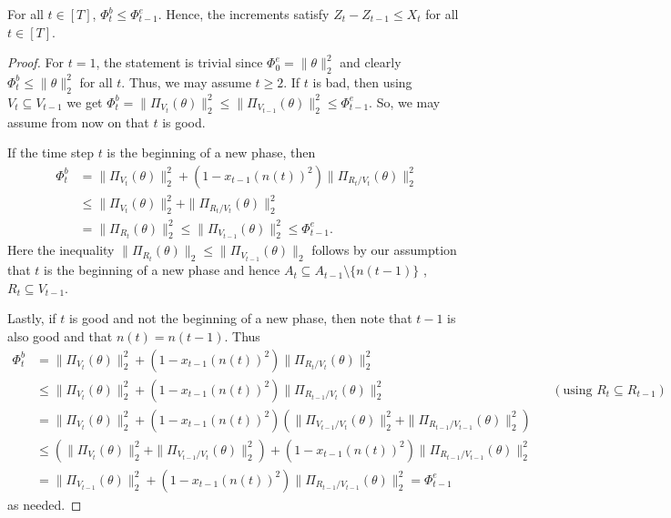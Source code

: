 \documentclass{toc}
\begin{document}
\begin{lemma}
\label{lem:freedrop}
For all $t \in [T]$, $\Phi^b_t \leq \Phi^e_{t-1}$. Hence, the increments satisfy $Z_t -Z_{t-1} \leq X_t$ for all $t \in [T]$.
\end{lemma}
\begin{proof}
For $t=1$, the statement is trivial since $\Phi^e_0 = \|\theta\|_2^2$ and
clearly $\Phi^b_t \leq \|\theta\|_2^2$ for all $t$. Thus, we may assume $t \geq 2$.
If $t$ is bad, then using $V_t \subseteq V_{t-1}$ we get $\Phi_{t}^b = \|\Pi_{V_{t}}(\theta)\|_2^2 \leq
\|\Pi_{V_{t-1}}(\theta)\|_2^2 \leq \Phi_{t-1}^e$. So, we may assume from now on that $t$ is good.

If the time step $t$ is the beginning of a new phase, then
\begin{align*}
\Phi^b_t &= \|\Pi_{V_t}(\theta)\|_2^2 + (1-x_{t-1}(n(t))^2) \|\Pi_{R_{t}/V_{t}}(\theta)\|_2^2 \\
         &\leq \|\Pi_{V_{t}}(\theta)\|_2^2 + \|\Pi_{R_{t}/V_{t}}(\theta)\|_2^2 \\
         &= \|\Pi_{R_t}(\theta)\|_2^2 \leq \|\Pi_{V_{t-1}}(\theta)\|_2^2 \leq \Phi^e_{t-1}.
\end{align*}
Here the inequality $\|\Pi_{R_{t}}(\theta)\|_2 \leq \|\Pi_{V_{t-1}}(\theta)\|_2$
follows by our assumption that $t$ is the beginning of a new phase and hence $A_t \subseteq A_{t-1} \setminus \{n(t-1)\}$ \ie, $R_{t} \subseteq V_{t-1}$.

Lastly, if $t$ is good and not the beginning of a new phase, then note that $t-1$ is also good and that $n(t) = n(t-1)$.  Thus
\begin{align*}
\Phi^b_t &= \|\Pi_{V_{t}}(\theta)\|_2^2 + (1-x_{t-1}(n(t))^2)\|\Pi_{R_{t}/V_{t}}(\theta)\|_2^2 \\
   &\leq \|\Pi_{V_{t}}(\theta)\|_2^2 + (1-x_{t-1}(n(t))^2)\|\Pi_{R_{t-1}/V_t}(\theta)\|_2^2
      && \left(\text{using } R_{t} \subseteq R_{t-1}\right) \\
    &= \|\Pi_{V_{t}}(\theta)\|_2^2 +
    (1-x_{t-1}(n(t))^2)\left(\|\Pi_{V_{t-1}/V_t}(\theta)\|_2^2 + \|\Pi_{R_{t-1}/V_{t-1}}(\theta)\|_2^2\right) \\
    &\leq \left(\|\Pi_{V_{t}}(\theta)\|_2^2 + \|\Pi_{V_{t-1}/V_{t}}(\theta)\|_2^2\right) +
          (1-x_{t-1}(n(t))^2) \|\Pi_{R_{t-1}/V_{t-1}}(\theta)\|_2^2 \\
    &= \|\Pi_{V_{t-1}}(\theta)\|_2^2 + (1-x_{t-1}(n(t))^2)
\|\Pi_{R_{t-1}/V_{t-1}}(\theta)\|_2^2 = \Phi_{t-1}^e
\end{align*}
as needed.
\end{proof}
\end{document}
